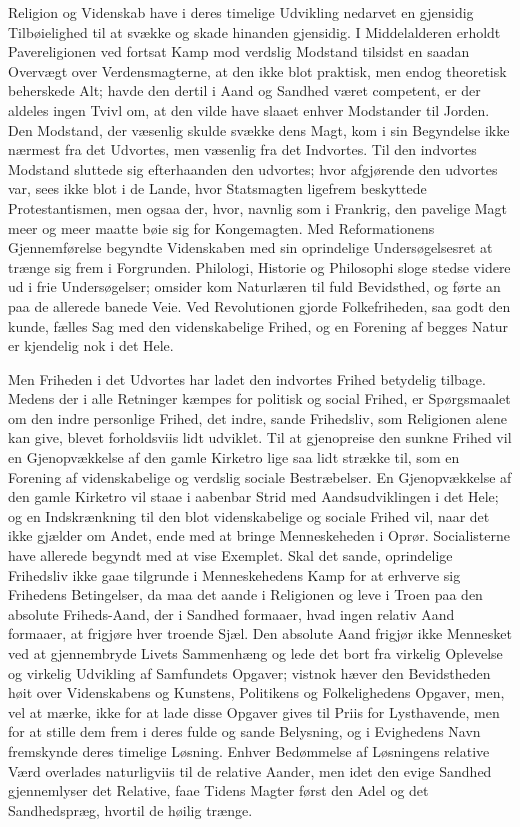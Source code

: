 \documentclass[12pt]{book}
\newcommand{\apage}[1]{\marginnote{\footnotesize\textit{[#1]}}}
\begin{document}
Religion og Videnskab have i deres timelige Udvikling nedarvet en gjensidig
Tilbøielighed til at svække og skade hinanden gjensidig. I Middelalderen
erholdt Pavereligionen ved fortsat Kamp mod verdslig Modstand tilsidst en
saadan Overvægt over Verdensmagterne, at den ikke blot praktisk, men endog
theoretisk beherskede Alt; havde den dertil i Aand og Sandhed været competent,
er der aldeles ingen Tvivl om, at den vilde have slaaet enhver Modstander til
Jorden. Den Modstand, der væsenlig skulde svække dens Magt, kom i sin
Begyndelse ikke nærmest fra det Udvortes, men væsenlig fra det Indvortes. Til
den indvortes Modstand sluttede sig efterhaanden den udvortes; hvor afgjørende
den udvortes var, sees ikke blot i de Lande, hvor Statsmagten ligefrem
beskyttede Protestantismen, men ogsaa der, hvor, navnlig som i Frankrig, den
pavelige Magt meer og meer maatte bøie sig for Kongemagten. Med Reformationens
Gjennemførelse begyndte Videnskaben med sin oprindelige Undersøgelsesret at
\apage{276} trænge sig frem i Forgrunden. Philologi, Historie og Philosophi sloge stedse
videre ud i frie Undersøgelser; omsider kom Naturlæren til fuld Bevidsthed, og
førte an paa de allerede banede Veie. Ved Revolutionen gjorde Folkefriheden,
saa godt den kunde, fælles Sag med den videnskabelige Frihed, og en Forening
af begges Natur er kjendelig nok i det Hele.

Men Friheden i det Udvortes har ladet den indvortes Frihed betydelig tilbage.
Medens der i alle Retninger kæmpes for politisk og social Frihed, er
Spørgsmaalet om den indre personlige Frihed, det indre, sande Frihedsliv, som
Religionen alene kan give, blevet forholdsviis lidt udviklet. Til at gjenopreise
den sunkne Frihed vil en Gjenopvækkelse af den gamle Kirketro lige saa lidt
strække til, som en Forening af videnskabelige og verdslig sociale
Bestræbelser. En Gjenopvækkelse af den gamle Kirketro vil staae i aabenbar
Strid med Aandsudviklingen i det Hele; og en Indskrænkning til den blot
videnskabelige og sociale Frihed vil, naar det ikke gjælder om Andet, ende med
at bringe Menneskeheden i Oprør. Socialisterne have allerede begyndt med at
vise Exemplet. Skal det sande, oprindelige Frihedsliv ikke gaae tilgrunde i
Menneskehedens Kamp for at erhverve sig Frihedens Betingelser, da maa det aande
i Religionen og leve i Troen paa den absolute Friheds-Aand, der i Sandhed
formaaer, hvad ingen relativ Aand formaaer, at frigjøre hver troende Sjæl. Den
absolute Aand frigjør ikke Mennesket ved at gjennembryde Livets Sammenhæng og
lede det bort fra virkelig Oplevelse og  \apage{277} virkelig Udvikling af Samfundets
Opgaver; vistnok hæver den Bevidstheden høit over Videnskabens og Kunstens,
Politikens og Folkelighedens Opgaver, men, vel at mærke, ikke for at lade disse
Opgaver gives til Priis for Lysthavende, men for at stille dem frem i deres
fulde og sande Belysning, og i Evighedens Navn fremskynde deres timelige
Løsning. Enhver Bedømmelse af Løsningens relative Værd overlades naturligviis
til de relative Aander, men idet den evige Sandhed gjennemlyser det Relative,
faae Tidens Magter først den Adel og det Sandhedspræg, hvortil de høilig
trænge.
\end{document}
